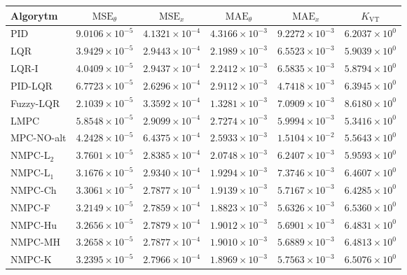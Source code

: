 \begin{tabular}{lccccc}
\hline
Algorytm & $\mathrm{MSE}_\theta$ & $\mathrm{MSE}_{x}$ & $\mathrm{MAE}_\theta$ & $\mathrm{MAE}_{x}$ & $K_\mathrm{VT}$ \\
\hline
PID & $9.0106\times10^{-5}$ & $4.1321\times10^{-4}$ & $4.3166\times10^{-3}$ & $9.2272\times10^{-3}$ & $6.2037\times10^{0}$ \\
LQR & $3.9429\times10^{-5}$ & $2.9443\times10^{-4}$ & $2.1989\times10^{-3}$ & $6.5523\times10^{-3}$ & $5.9039\times10^{0}$ \\
LQR-I & $4.0409\times10^{-5}$ & $2.9437\times10^{-4}$ & $2.2412\times10^{-3}$ & $6.5835\times10^{-3}$ & $5.8794\times10^{0}$ \\
PID-LQR & $6.7723\times10^{-5}$ & {\boldmath$2.6296\times10^{-4}$} & $2.9112\times10^{-3}$ & {\boldmath$4.7418\times10^{-3}$} & $6.3945\times10^{0}$ \\
Fuzzy-LQR & {\boldmath$2.1039\times10^{-5}$} & $3.3592\times10^{-4}$ & {\boldmath$1.3281\times10^{-3}$} & $7.0909\times10^{-3}$ & $8.6180\times10^{0}$ \\
LMPC & $5.8548\times10^{-5}$ & $2.9099\times10^{-4}$ & $2.7274\times10^{-3}$ & $5.9994\times10^{-3}$ & {\boldmath$5.3416\times10^{0}$} \\
MPC-NO-alt & $4.2428\times10^{-5}$ & $6.4375\times10^{-4}$ & $2.5933\times10^{-3}$ & $1.5104\times10^{-2}$ & $5.5643\times10^{0}$ \\
\hline
NMPC-L$_2$ & $3.7601\times10^{-5}$ & $2.8385\times10^{-4}$ & $2.0748\times10^{-3}$ & $6.2407\times10^{-3}$ & $5.9593\times10^{0}$ \\
NMPC-L$_1$ & $3.1676\times10^{-5}$ & $2.9340\times10^{-4}$ & $1.9294\times10^{-3}$ & $7.3746\times10^{-3}$ & $6.4607\times10^{0}$ \\
NMPC-Ch & $3.3061\times10^{-5}$ & $2.7877\times10^{-4}$ & $1.9139\times10^{-3}$ & $5.7167\times10^{-3}$ & $6.4285\times10^{0}$ \\
NMPC-F & $3.2149\times10^{-5}$ & $2.7859\times10^{-4}$ & $1.8823\times10^{-3}$ & $5.6326\times10^{-3}$ & $6.5360\times10^{0}$ \\
NMPC-Hu & $3.2656\times10^{-5}$ & $2.7879\times10^{-4}$ & $1.9012\times10^{-3}$ & $5.6901\times10^{-3}$ & $6.4831\times10^{0}$ \\
NMPC-MH & $3.2658\times10^{-5}$ & $2.7877\times10^{-4}$ & $1.9010\times10^{-3}$ & $5.6889\times10^{-3}$ & $6.4813\times10^{0}$ \\
NMPC-K & $3.2395\times10^{-5}$ & $2.7966\times10^{-4}$ & $1.8969\times10^{-3}$ & $5.7563\times10^{-3}$ & $6.5076\times10^{0}$ \\

\end{tabular}
